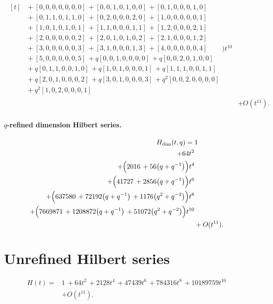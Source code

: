 \documentclass[10pt]{article}
\begin{document}
\[\begin{aligned}
\begin{aligned}[t]
  &{}+[0,0,0,0,0,0,0]\,+[0,0,1,0,1,0,0]\,+[0,1,0,0,0,1,0] \\
  &{}+[0,1,1,0,1,1,0]\,+[0,2,0,0,0,2,0]\,+[1,0,0,0,0,0,1] \\
  &{}+[1,0,1,0,1,0,1]\,+[1,1,0,0,0,1,1]\,+[1,2,0,0,0,2,1] \\
  &{}+[2,0,0,0,0,0,2]\,+[2,0,1,0,1,0,2]\,+[2,1,0,0,0,1,2] \\
  &{}+[3,0,0,0,0,0,3]\,+[3,1,0,0,0,1,3]\,+[4,0,0,0,0,0,4] \\
  &{}+[5,0,0,0,0,0,5]\,+q[0,0,1,0,0,0,0]\,+q[0,0,2,0,1,0,0] \\
  &{}+q[0,1,1,0,0,1,0]\,+q[1,0,1,0,0,0,1]\,+q[1,1,1,0,0,1,1] \\
  &{}+q[2,0,1,0,0,0,2]\,+q[3,0,1,0,0,0,3]\,+q^{2}[0,0,2,0,0,0,0] \\
  &{}+q^{2}[1,0,2,0,0,0,1]\end{aligned}\Bigr)t^{10} \\
  &+ O(t^{11}).
\end{aligned}
\]
\paragraph{$q$-refined dimension Hilbert series.}
\[
\begin{aligned}
H_{\mathrm{dim}}(t,q) ={}&
   1 \\
  + 64t^{2} \\
  + \Bigl(2016\,+56\bigl(q+q^{-1}\bigr)\Bigr)t^{4} \\
  + \Bigl(41727\,+2856\bigl(q+q^{-1}\bigr)\Bigr)t^{6} \\
  + \Bigl(637580\,+72192\bigl(q+q^{-1}\bigr)\,+1176\bigl(q^{2}+q^{-2}\bigr)\Bigr)t^{8} \\
  + \Bigl(7669871\,+1208872\bigl(q+q^{-1}\bigr)\,+51072\bigl(q^{2}+q^{-2}\bigr)\Bigr)t^{10} \\
  &+ O(t^{11}).
\end{aligned}
\]

\section{Unrefined Hilbert series}
\[
\begin{aligned}
H(t) ={}& 1\,+64t^{2}\,+2128t^{4}\,+47439t^{6}\,+784316t^{8}\,+10189759t^{10} \\
  &+ O(t^{11}).
\end{aligned}
\]
\end{document}
